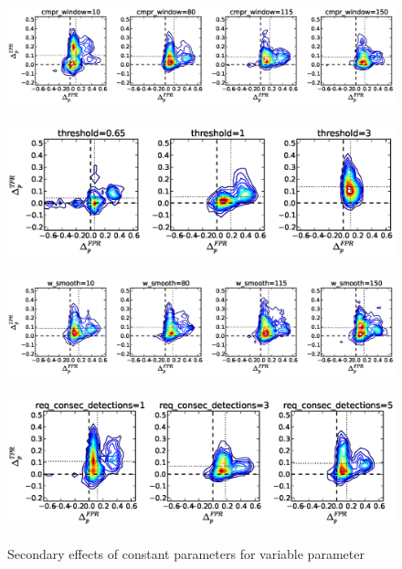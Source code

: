 \begin{figure}[!h]
\begin{center}
\includegraphics[height=1.5in]{../fig/final/delta_hist_sec/gamma/cmpr_window}
\includegraphics[height=1.5in]{../fig/final/delta_hist_sec/gamma/threshold}
\includegraphics[height=1.5in]{../fig/final/delta_hist_sec/gamma/w_smooth}
\includegraphics[height=1.5in]{../fig/final/delta_hist_sec/gamma/req_consec_detections}
\end{center}
\caption{\label{fig:delta_sec1} Secondary effects of constant parameters for variable parameter }
\end{figure}

